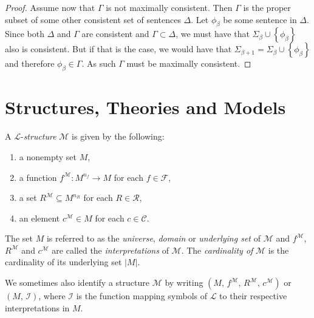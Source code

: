 \documentclass[../../main.tex]{subfiles}
\begin{document}
\begin{proof}
    Assume now that $\Gamma$ is not maximally consistent.
    Then $\Gamma$ is the proper subset of some other consistent set of sentences $\Delta$.
    Let $\phi_{\beta}$ be some sentence in $\Delta$.
    Since both $\Delta$ and $\Gamma$ are consistent and $\Gamma \subset \Delta$, 
    we must have that $\Sigma_{\beta} \cup \left\{\phi_{\beta}\right\}$ also is consistent.
    But if that is the case, we would have that $\Sigma_{\beta + 1} = \Sigma_{\beta} \cup \left\{\phi_{\beta}\right\}$ and therefore $\phi_{\beta} \in \Gamma$.
    As such $\Gamma$ must be maximally consistent.
\end{proof}

\section{Structures, Theories and Models}
\begin{definition}\label{structure-def}
    A $\mathcal{L}$-\textit{structure} $\mathcal{M}$ is given by the following:
    \begin{enumerate}
        \item a nonempty set $M$,
        \item a function $f^{\mathcal{M}}: M^{n_f} \to M$ for each $f \in \mathcal{F}$,
        \item a set $R^\mathcal{M} \subseteq M^{n_R}$ for each $R \in \mathcal{R}$,
        \item an element $c^\mathcal{M} \in M$ for each $c \in \mathcal{C}$.
    \end{enumerate}
    The set $M$ is referred to as the \textit{universe}, \textit{domain} or \textit{underlying set} of $\mathcal{M}$ 
    and $f^{\mathcal{M}}$, $R^{\mathcal{M}}$ and $c^{\mathcal{M}}$ are called the \textit{interpretations} of $\mathcal{M}$. 
    The \textit{cardinality of} $\mathcal{M}$ is the cardinality of its underlying set $\left\lvert M\right\rvert$. \cite[Definition 1.1.2]{Mar02}

    We sometimes also identify a structure $\mathcal{M}$ by writing $\left(M,\, f^{\mathcal{M}},\, R^{\mathcal{M}},\, c^{\mathcal{M}}\right)$ \cite{Mar02} or $\left(M,\, \mathcal{I}\right)$, 
    where $\mathcal{I}$ is the function mapping symbols of $\mathcal{L}$ to their respective interpretations in $M$. \cite[p.20]{Cha90}
\end{definition}
\end{document}
